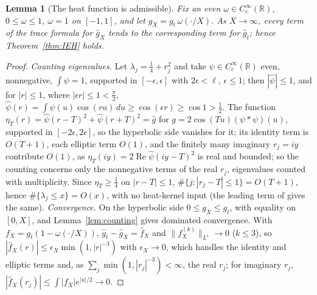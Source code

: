 \documentclass[pdflatex,sn-mathphys-num]{sn-jnl}
\theoremstyle{thmstyleone}%
\newtheorem{lemma}[theorem]{Lemma}%
\theoremstyle{thmstylethree}%
\newcommand{\R}{\mathbb{R}}
\begin{document}
\begin{appendices}
\begin{lemma}[The heat function is admissible]\label{lem:admissible}
Fix an even $\omega\in C_c^\infty(\R)$, $0\le\omega\le1$, $\omega=1$ on $[-1,1]$, and let $g_X=g_t\,\omega(\cdot/X)$. As $X\to\infty$, every term of the trace formula for $\hat g_X$ tends to the corresponding term for $\hat g_t$; hence Theorem~\ref{thm:IEH} holds.
\end{lemma}

\begin{proof}
\emph{Counting eigenvalues.} Let $\lambda_j=\frac14+r_j^2$ and take $\psi\in C_c^\infty(\R)$ even, nonnegative, $\int\psi=1$, supported in $[-\epsilon,\epsilon]$ with $2\epsilon<\ell$, $\epsilon\le1$; then $|\hat\psi|\le1$, and for $|r|\le1$, where $|\epsilon r|\le1<\frac\pi2$, $\hat\psi(r)=\int\psi(u)\cos(ru)\,du\ge\cos(\epsilon r)\ge\cos1>\frac12$. The function $\eta_T(r)=\hat\psi(r-T)^2+\hat\psi(r+T)^2=\hat g$ for $g=2\cos(Tu)(\psi*\psi)(u)$, supported in $[-2\epsilon,2\epsilon]$, so the hyperbolic side vanishes for it; its identity term is $O(T+1)$, each elliptic term $O(1)$, and the finitely many imaginary $r_j=iy$ contribute $O(1)$, as $\eta_T(iy)=2\operatorname{Re}\hat\psi(iy-T)^2$ is real and bounded; so the counting concerns only the nonnegative terms of the real $r_j$, eigenvalues counted with multiplicity. Since $\eta_T\ge\frac14$ on $|r-T|\le1$, $\#\{j:|r_j-T|\le1\}=O(T+1)$, hence $\#\{\lambda_j\le x\}=O(x)$, with no heat-kernel input (the leading term of \cite[Thm~4.8]{dggw2008} gives the same).
\emph{Convergence.} On the hyperbolic side $0\le g_X\le g_t$, with equality on $[0,X]$, and Lemma~\ref{lem:counting} gives dominated convergence. With $f_X=g_t(1-\omega(\cdot/X))$, $\hat g_t-\hat g_X=\hat f_X$ and $\|f_X^{(k)}\|_{L^1}\to0$ ($k\le3$), so $|\hat f_X(r)|\le\epsilon_X\min(1,|r|^{-3})$ with $\epsilon_X\to0$, which handles the identity and elliptic terms and, as $\sum_j\min(1,|r_j|^{-3})<\infty$, the real $r_j$; for imaginary $r_j$, $|\hat f_X(r_j)|\le\int|f_X|e^{|u|/2}\to0$.
\end{proof}


\end{appendices}
\end{document}
